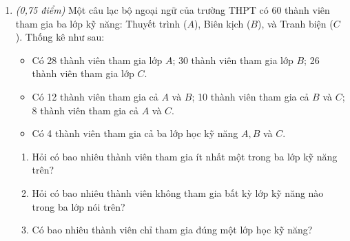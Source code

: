 \documentclass[12pt,a4paper]{article}
\newcommand{\parttitle}[1]{\par\vspace{1.5pt}{\large\bfseries\color{ink}#1}\par\vspace{1.0pt}}
\begin{document}
\begin{enumerate}[resume]
\begin{minipage}[t]{0.35\linewidth}
\end{minipage}

\item \textit{(0,75 điểm)} Một câu lạc bộ ngoại ngữ của trường THPT có 60 thành viên tham gia ba lớp kỹ năng: Thuyết trình ($A$), Biên kịch ($B$), và Tranh biện ($C$). Thống kê như sau:
\begin{itemize}
    \item Có 28 thành viên tham gia lớp $A$; 30 thành viên tham gia lớp $B$; 26 thành viên tham gia lớp $C$.
    \item Có 12 thành viên tham gia cả $A$ và $B$; 10 thành viên tham gia cả $B$ và $C$; 8 thành viên tham gia cả $A$ và $C$.
    \item Có 4 thành viên tham gia cả ba lớp học kỹ năng $A, B$ và $C$.
\end{itemize}
\begin{enumerate}
    \item Hỏi có bao nhiêu thành viên tham gia ít nhất một trong ba lớp kỹ năng trên?
    \item Hỏi có bao nhiêu thành viên không tham gia bất kỳ lớp kỹ năng nào trong ba lớp nói trên?
    \item Có bao nhiêu thành viên chỉ tham gia đúng một lớp học kỹ năng?
\end{enumerate}
\end{enumerate}

\newpage
\parttitle{BẢNG ĐÁP ÁN TỔNG HỢP}
\end{document}
